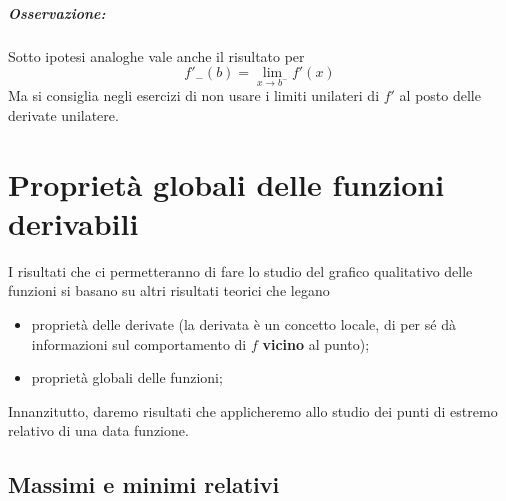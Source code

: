 \documentclass[twoside]{report}
\begin{document}
\paragraph{Osservazione:} Sotto ipotesi analoghe vale anche il risultato per  \[
f'_{-}(b) = \lim_{x \to b ^{-}} f'(x)
\] Ma si consiglia negli esercizi di non usare i limiti unilateri di \(f'\) al posto delle derivate unilatere.

\chapter{Proprietà globali delle funzioni derivabili}
I risultati che ci permetteranno di fare lo studio del grafico qualitativo delle funzioni si basano su altri risultati teorici che legano 
\begin{itemize}
    \item proprietà delle derivate (la derivata è un concetto locale, di per sé dà informazioni sul comportamento di \(f\) \textbf{vicino} al punto);
    \item proprietà globali delle funzioni;
\end{itemize}

Innanzitutto, daremo risultati che applicheremo allo studio dei punti di estremo relativo di una data funzione.

\section{Massimi e minimi relativi}
\end{document}
